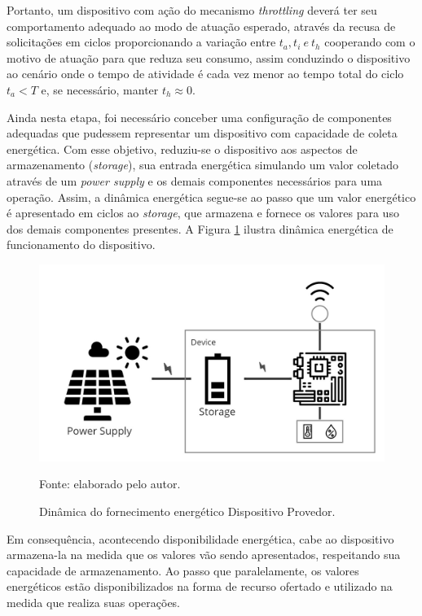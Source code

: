 Portanto, um dispositivo com ação do mecanismo \textit{throttling} deverá ter seu comportamento adequado ao modo de atuação esperado, através da recusa de solicitações em ciclos proporcionando a variação entre $ t_a, t_i \ e\ t_h$ cooperando com o motivo de atuação para que reduza seu consumo, assim conduzindo o dispositivo ao cenário onde o tempo de atividade é cada vez menor ao tempo total do ciclo \( t_a < T \) e, se necessário, manter $t_h \approx 0$.

Ainda nesta etapa, foi necessário conceber uma configuração de componentes adequadas que pudessem representar um dispositivo com capacidade de coleta energética. Com esse objetivo, reduziu-se o dispositivo aos aspectos de armazenamento (\textit{storage}), sua entrada energética simulando um valor coletado através de um \textit{power supply} e os demais componentes necessários para uma operação. Assim, a dinâmica energética segue-se ao passo que um valor energético é apresentado em ciclos ao \textit{storage}, que armazena e fornece os valores para uso dos demais componentes presentes. A Figura \ref{fig:cap6dinamica} ilustra dinâmica energética de funcionamento do dispositivo.

\begin{figure}[H]
	\centering
	
	\caption{Dinâmica do fornecimento energético Dispositivo Provedor.}
	\label{fig:cap6dinamica}
	\noindent\includegraphics[width=0.75\linewidth]{Imagens/cap6/cap6dinamica.jpg} 
		
	Fonte: elaborado pelo autor.
\end{figure}


Em consequência, acontecendo disponibilidade energética, cabe ao dispositivo armazena-la na medida que os valores vão sendo apresentados, respeitando sua capacidade de armazenamento. Ao passo que paralelamente, os valores energéticos estão disponibilizados na forma de recurso ofertado e utilizado na medida que realiza suas operações.


